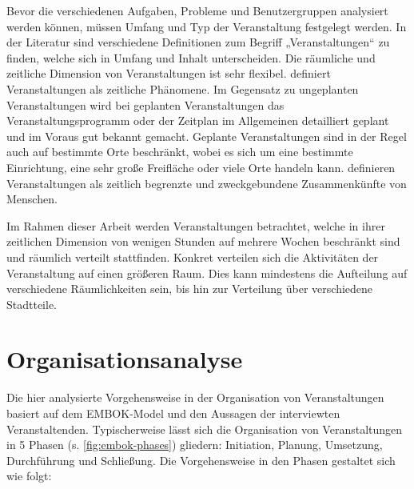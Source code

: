 Bevor die verschiedenen Aufgaben, Probleme und Benutzergruppen analysiert werden
können, müssen Umfang und Typ der Veranstaltung festgelegt werden. In der
Literatur sind verschiedene Definitionen zum Begriff „Veranstaltungen“ zu
finden, welche sich in Umfang und Inhalt unterscheiden. Die räumliche und
zeitliche Dimension von Veranstaltungen ist sehr flexibel. \textcite{Getz2007}
definiert Veranstaltungen als zeitliche Phänomene. Im Gegensatz zu ungeplanten
Veranstaltungen wird bei geplanten Veranstaltungen das Veranstaltungsprogramm
oder der Zeitplan im Allgemeinen detailliert geplant und im Voraus gut bekannt
gemacht. Geplante Veranstaltungen sind in der Regel auch auf bestimmte Orte
beschränkt, wobei es sich um eine bestimmte Einrichtung, eine sehr große
Freifläche oder viele Orte handeln kann. \textcite{Bladen2012} definieren
Veranstaltungen als zeitlich begrenzte und zweckgebundene Zusammenkünfte von
Menschen.

Im Rahmen dieser Arbeit werden Veranstaltungen betrachtet, welche in ihrer
zeitlichen Dimension von wenigen Stunden auf mehrere Wochen beschränkt sind und
räumlich verteilt stattfinden. Konkret verteilen sich die Aktivitäten der
Veranstaltung auf einen größeren Raum. Dies kann mindestens die Aufteilung auf
verschiedene Räumlichkeiten sein, bis hin zur Verteilung über verschiedene
Stadtteile.


\section{Organisationsanalyse} \label{sec:analysis-org}

Die hier analysierte Vorgehensweise in der Organisation von Veranstaltungen
basiert auf dem EMBOK-Model \cite{Silvers2013} und den Aussagen der interviewten
Veranstaltenden. Typischerweise lässt sich die Organisation von Veranstaltungen
in 5 Phasen (s. \autoref{fig:embok-phases}) gliedern: Initiation, Planung,
Umsetzung, Durchführung und Schließung. Die Vorgehensweise in den Phasen
gestaltet sich wie folgt:

